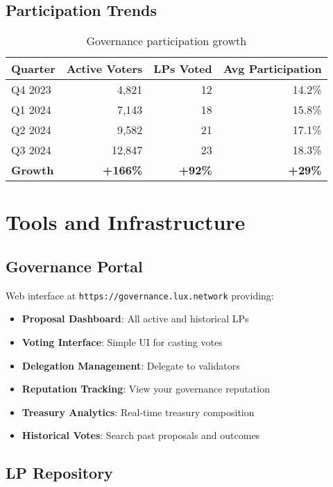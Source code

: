 \documentclass[11pt,a4paper]{article}
\begin{document}
\subsection{Participation Trends}

\begin{table}[h]
\centering
\begin{tabular}{@{}lrrr@{}}
\toprule
\textbf{Quarter} & \textbf{Active Voters} & \textbf{LPs Voted} & \textbf{Avg Participation} \\ \midrule
Q4 2023 & 4,821 & 12 & 14.2\% \\
Q1 2024 & 7,143 & 18 & 15.8\% \\
Q2 2024 & 9,582 & 21 & 17.1\% \\
Q3 2024 & 12,847 & 23 & 18.3\% \\ \midrule
\textbf{Growth} & \textbf{+166\%} & \textbf{+92\%} & \textbf{+29\%} \\ \bottomrule
\end{tabular}
\caption{Governance participation growth}
\end{table}

\section{Tools and Infrastructure}

\subsection{Governance Portal}

Web interface at \texttt{https://governance.lux.network} providing:

\begin{itemize}
\item \textbf{Proposal Dashboard}: All active and historical LPs
\item \textbf{Voting Interface}: Simple UI for casting votes
\item \textbf{Delegation Management}: Delegate to validators
\item \textbf{Reputation Tracking}: View your governance reputation
\item \textbf{Treasury Analytics}: Real-time treasury composition
\item \textbf{Historical Votes}: Search past proposals and outcomes
\end{itemize}

\subsection{LP Repository}
\end{document}
